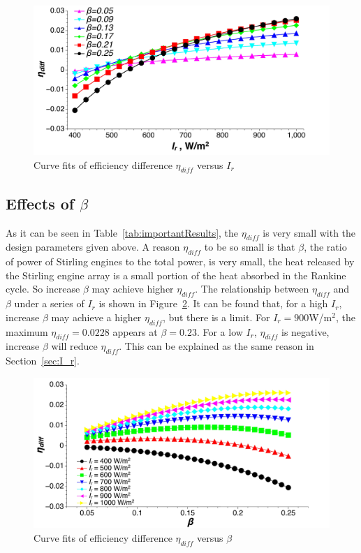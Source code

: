\noindent \begin{figure}[htbp]
\begin{center}
	\includegraphics[width = 0.8\columnwidth, angle = 0]{fig/I_r-eta_diff}
	\caption{Curve fits of efficiency difference $\eta_{diff}$ versus $I_r$}
	\label{fig:I_r-eta_diff}
\end{center}
\end{figure}

\subsection{Effects of $\beta$}

As it can be seen in Table~\ref{tab:importantResults}, the $\eta_{diff}$ is very small with the design parameters given above. A reason $\eta_{diff}$ to be so small is that $\beta$, the ratio of power of Stirling engines to the total power, is very small, the heat released by the Stirling engine array is a small portion of the heat absorbed in the Rankine cycle. So increase $\beta$ may achieve higher $\eta_{diff}$. The relationship between $\eta_{diff}$ and $\beta$ under a series of $I_r$ is shown in Figure~\ref{fig:beta-eta_diff}. It can be found that, for a high $I_r$, increase $\beta$ may achieve a higher $\eta_{diff}$, but there is a limit. For $I_r=900$W/m$^2$, the maximum $\eta_{diff}=0.0228$ appears at $\beta=0.23$. For a low $I_r$, $\eta_{diff}$ is negative, increase $\beta$ will reduce $\eta_{diff}$. This can be explained as the same reason in Section~\ref{sec:I_r}.

\noindent \begin{figure}[H]
\begin{center}
	\includegraphics[width = 0.8\columnwidth, angle = 0]{fig/beta-eta_diff}
	\caption{Curve fits of efficiency difference $\eta_{diff}$ versus $\beta$}
	\label{fig:beta-eta_diff}
\end{center}
\end{figure}

